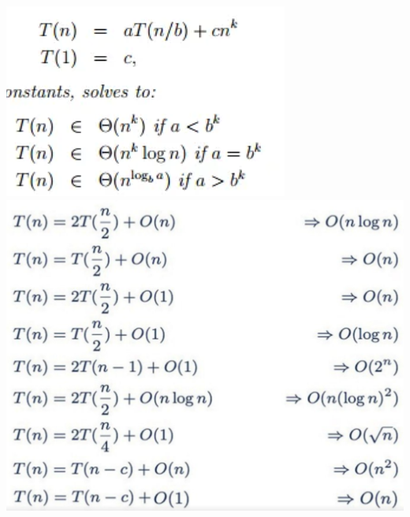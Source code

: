 \documentclass[10pt, landscape]{article}
\begin{document}
\begin{multicols*}{4}
\begin{center}
    \includegraphics[width=0.7\linewidth]{master.png}    
    \includegraphics[width=0.9\linewidth]{common.png}    
\end{center}

\begin{center}
\end{center}


\end{multicols*}
\end{document}

